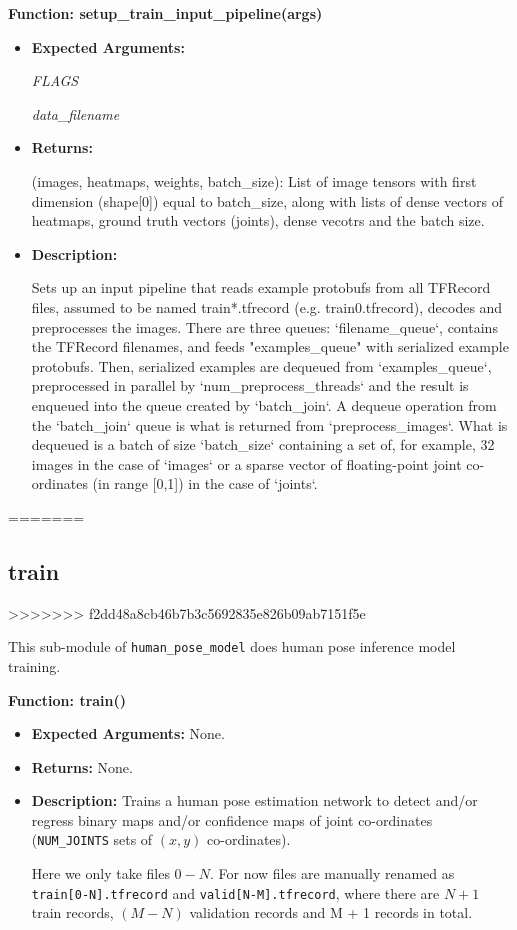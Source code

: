 \documentclass{scrreprt}
\begin{document}
\textbf{Function: setup\_train\_input\_pipeline(args)}
\begin{itemize}
    \item \textbf{Expected Arguments:}

            \quad\textit{FLAGS}

            \quad\textit{data\_filename}

    \item \textbf{Returns:}

            (images, heatmaps, weights, batch_size): List of image tensors with first dimension (shape[0]) equal to batch_size, along with lists of dense vectors of heatmaps, ground truth vectors (joints), dense vecotrs and the batch size. 

    \item \textbf{Description:}

            Sets up an input pipeline that reads example protobufs from all TFRecord files, assumed to be named train*.tfrecord (e.g. train0.tfrecord), decodes and preprocesses the images.
            There are three queues: `filename\_queue`, contains the TFRecord filenames, and feeds "examples\_queue" with serialized example protobufs.
            Then, serialized examples are dequeued from `examples\_queue`, preprocessed in parallel by `num\_preprocess\_threads` and the result is enqueued into the queue created by `batch\_join`. A dequeue operation from the `batch\_join` queue is what is returned from `preprocess\_images`. What is dequeued is a batch of size `batch\_size` containing a set of, for example, 32 images in
            the case of `images` or a sparse vector of floating-point joint
            co-ordinates (in range [0,1]) in the case of `joints`.

\end{itemize}

\break
=======
\subsection{train}
>>>>>>> f2dd48a8cb46b7b3c5692835e826b09ab7151f5e

This sub-module of \verb|human_pose_model| does human pose inference model
training.

\textbf{Function: train()}

\begin{itemize}
        \item \textbf{Expected Arguments:} None.

        \item \textbf{Returns:} None.

        \item \textbf{Description:} Trains a human pose estimation network to
                detect and/or regress binary maps and/or confidence maps of
                joint co-ordinates (\verb|NUM_JOINTS| sets of $(x, y)$ co-ordinates).

                Here we only take files $0-N$.  For now files are manually renamed as
                \verb|train[0-N].tfrecord| and \verb|valid[N-M].tfrecord|,
                where there are $N + 1$ train records, $(M - N)$ validation
                records and M + 1 records in total.
\end{itemize}
\end{document}
